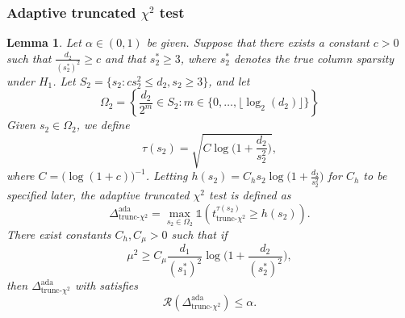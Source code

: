 \documentclass{article}
\newcommand{\cR}{\mathcal{R}}
\newcommand{\one}{\mathds{1}}
\newcommand{\chisqlin}{\text{trunc-$\chi^2$}}
\newtheorem{lemma}{Lemma}
\theoremstyle{remark}
\begin{document}
\subsubsection{Adaptive truncated $\chi^2$ test}
\begin{lemma}\label{lem_ub_ada_linear}
    Let $\alpha \in (0,1)$ be given. Suppose that there exists a constant $c > 0$ such that $\frac{d_2}{(s_2^*)^2} \geq c$ and that $s_2^* \geq 3$, where $s_2^*$ denotes the true column sparsity under $H_1$. Let $S_2 = \{s_2 : cs_2^2 \leq d_2, s_2 \geq 3\}$, and let
    \[\Omega_2 = \left\{\frac{d_2}{2^m} \in S_2 : m \in \{0, \ldots, \lfloor \log_2(d_2) \rfloor\}\right\}\]
    Given $s_2 \in \Omega_2$, we define
    \[\tau(s_2) = \sqrt{C\log\Big(1 + \frac{d_2}{s_2^2}\Big)},\]
where $C = \big(\log(1 + c)\big)^{-1}$. Letting $h(s_2) = C_hs_2\log\big(1 + \frac{d_2}{s_2^2}\big)$ for $C_h$ to be specified later, the adaptive truncated $\chi^2$ test is defined as
\[\Delta^{\text{ada}}_{\chisqlin} = \max_{s_2 \in \Omega_2}\one(t^{\tau(s_2)}_{\chisqlin} \geq h(s_2)).\]
There exist constants $C_h, C_\mu > 0$ such that if
\[\mu^2 \geq C_\mu \frac{d_1}{(s^*_1)^2}\log\big(1 + \frac{d_2}{(s^*_2)^2}\big),\]
then $\Delta^{\text{ada}}_{\chisqlin}$ with  satisfies
\[\cR(\Delta^{\text{ada}}_{\chisqlin}) \leq \alpha.\]
\end{lemma}
\end{document}
